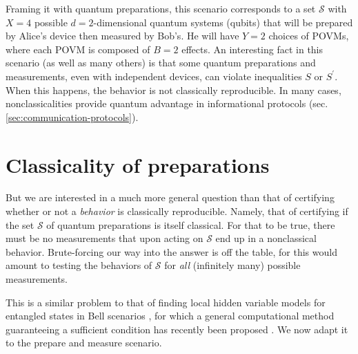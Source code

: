     Framing it with quantum preparations, this scenario corresponds to a set $\mathcal{S}$ with $X=4$ possible $d=2$-dimensional quantum systems (qubits) that will be prepared by Alice's device then measured by Bob's. He will have $Y=2$ choices of POVMs, where each POVM is composed of $B=2$ effects. An interesting fact in this scenario (as well as many others) is that some quantum preparations and measurements, even with independent devices, can violate inequalities $S$ or $S^\prime$. When this happens, the behavior is not classically reproducible. In many cases, nonclassicalities provide quantum advantage in informational protocols (sec. \ref{sec:communication-protocols}). 

    \section{Classicality of preparations}
    \label{sec:preparation-classicality}

        But we are interested in a much more general question than that of certifying whether or not a \emph{behavior} is classically reproducible. Namely, that of certifying if the set $\mathcal{S}$ of quantum preparations is itself classical. For that to be true, there must be no measurements that upon acting on $\mathcal{S}$ end up in a nonclassical behavior. Brute-forcing our way into the answer is off the table, for this would amount to testing the behaviors of $\mathcal{S}$ for \emph{all} (infinitely many) possible measurements.

        This is a similar problem to that of finding local hidden variable models for entangled states in Bell scenarios \cite{acin_2006_grothendieck,hirsch_2017_betterlocalhidden}, for which a general computational method guaranteeing a sufficient condition has recently been proposed \cite{cavalcanti_generalmethod_2016,hirsch_algorithmic_2016}. We now adapt it to the prepare and measure scenario.

